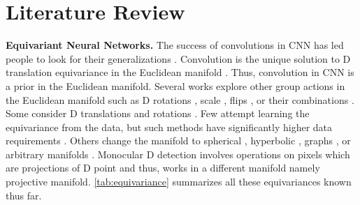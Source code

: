 \documentclass[runningheads]{llncs}
\newcommand{\twoD}{D}
\newcommand{\threeD}{D}
\newcommand{\Equivariant} {Equivariant}
\newcommand{\equivariance}{equivariance}
\newcommand{\manifold}{manifold}
\newcommand{\noIndentHeading}[1]{\noindent\textbf{#1}}
\begin{document}
\section{Literature Review}

\noIndentHeading{\Equivariant{} Neural Networks.}
        The success of convolutions in CNN has led people to look for their generalizations \cite{cohen2016group,weiler2021coordinate}.
Convolution is the unique solution to \twoD{} translation \equivariance{} in the Euclidean \manifold{} \cite{bronstein2021convolution, bronstein2021geometric, rath2020boosting}.
        Thus, convolution in CNN is a prior in the Euclidean \manifold.
        Several works explore other group actions in the Euclidean \manifold{} such as \twoD{} rotations \cite{cohen2014learning, dieleman2016exploiting, marcos2017rotation, weiler2018learning}, scale \cite{kanazawa2014locally, marcos2018scale}, flips \cite{yeh2019chirality}, or their combinations \cite{worrall2017harmonic, wang2021incorporating}. 
        Some consider \threeD{} translations \cite{worrall2018cubenet} and rotations \cite{thomas2018tensor}. Few \cite{dosovitskiy2021image, wilk2018learning, zhou2020meta} attempt learning the equivariance from the data, but such methods have significantly higher data requirements \cite{worrall2018cubenet}.
        Others change the \manifold{} to spherical \cite{cohen2018spherical}, hyperbolic \cite{ganea2018hyperbolic}, graphs \cite{micheli2009neural}, or arbitrary manifolds \cite{jing2020physical}. 
        Monocular \threeD{} detection involves operations on pixels which are projections of \threeD{} point and thus, works in a different \manifold{} namely projective \manifold.
        \cref{tab:equivariance} summarizes all these \equivariance{}s known thus far.
\end{document}
